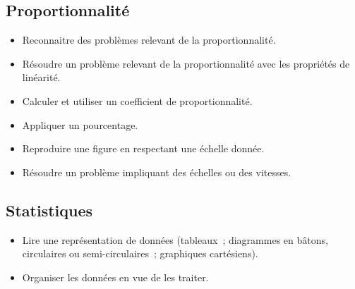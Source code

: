 \documentclass[a4paper,12pt,fleqn]{article}	
\begin{document}
\renewcommand{\labelitemi}{}

\subsection*{Proportionnalité}

\begin{itemize}
	\item {}Reconnaitre des problèmes relevant de la proportionnalité.
	\item {}Résoudre un problème relevant de la proportionnalité avec les propriétés de linéarité.
	\item {}Calculer et utiliser un coefficient de proportionnalité.
	\item {}Appliquer un pourcentage.
	\item {}Reproduire une figure en respectant une échelle donnée.
	\item {}Résoudre un problème impliquant des échelles ou des vitesses.
\end{itemize}

\subsection*{Statistiques}

\begin{itemize}
	\item {}Lire une représentation de données (tableaux ; diagrammes en bâtons, circulaires ou semi-circulaires ; graphiques cartésiens).
	\item {}Organiser les données en vue de les traiter.
\end{itemize}
	
\end{document}
